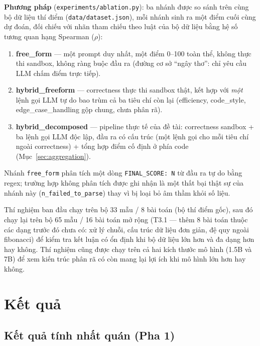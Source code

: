 \documentclass[a4paper,12pt]{report}
\begin{document}
\textbf{Phương pháp} (\texttt{experiments/ablation.py}): ba nhánh được so
sánh trên cùng bộ dữ liệu thí điểm (\texttt{data/dataset.json}), mỗi nhánh
sinh ra một điểm cuối cùng dự đoán, đối chiếu với nhãn tham chiếu theo luật
của bộ dữ liệu bằng hệ số tương quan hạng Spearman ($\rho$):
\begin{enumerate}
  \item \textbf{free\_form} — một prompt duy nhất, một điểm 0--100 toàn
    thể, không thực thi sandbox, không ràng buộc đầu ra (đường cơ sở
    ``ngây thơ'': chỉ yêu cầu LLM chấm điểm trực tiếp).
  \item \textbf{hybrid\_freeform} — correctness thực thi sandbox thật, kết
    hợp với \emph{một} lệnh gọi LLM tự do bao trùm cả ba tiêu chí còn lại
    (efficiency, code\_style, edge\_case\_handling gộp chung, chưa phân
    rã).
  \item \textbf{hybrid\_decomposed} — pipeline thực tế của đề tài:
    correctness sandbox + ba lệnh gọi LLM độc lập, đầu ra có cấu trúc (một
    lệnh gọi cho mỗi tiêu chí ngoài correctness) + tổng hợp điểm cố định ở
    phía code (Mục~\ref{sec:aggregation}).
\end{enumerate}

Nhánh \texttt{free\_form} phân tích một dòng \texttt{FINAL\_SCORE: N} từ
đầu ra tự do bằng regex; trường hợp không phân tích được ghi nhận là một
thất bại thật sự của nhánh này (\texttt{n\_failed\_to\_parse}) thay vì bị
loại bỏ âm thầm khỏi số liệu.

Thí nghiệm ban đầu chạy trên bộ 33 mẫu / 8 bài toán (bộ thí điểm gốc), sau
đó chạy lại trên bộ 65 mẫu / 16 bài toán mở rộng (T3.1 — thêm 8 bài toán
thuộc các dạng trước đó chưa có: xử lý chuỗi, cấu trúc dữ liệu đơn giản, đệ
quy ngoài fibonacci) để kiểm tra kết luận có ổn định khi bộ dữ liệu lớn hơn
và đa dạng hơn hay không. Thí nghiệm cũng được chạy trên cả hai kích thước
mô hình (1.5B và 7B) để xem kiến trúc phân rã có còn mang lại lợi ích khi
mô hình lớn hơn hay không.

\chapter{Kết quả}
\label{ch:results}

\section{Kết quả tính nhất quán (Pha 1)}
\label{sec:results-consistency}
\end{document}
